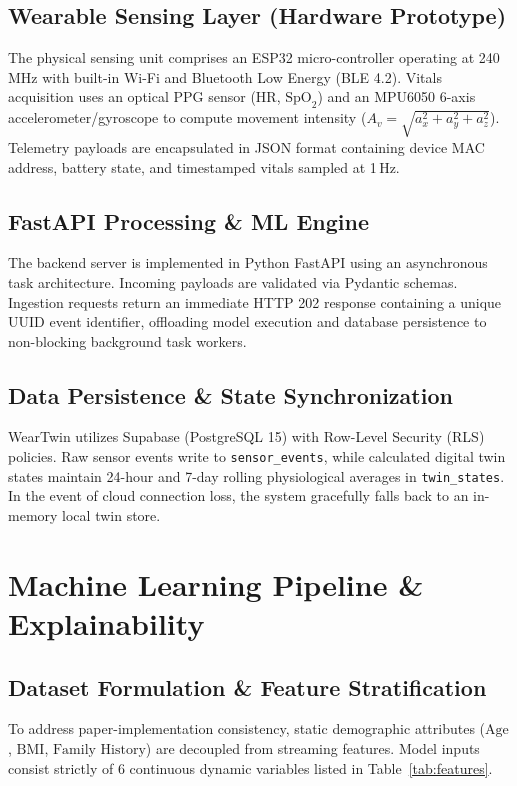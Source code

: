 \documentclass[conference]{IEEEtran}
\begin{document}
\subsection{Wearable Sensing Layer (Hardware Prototype)}
The physical sensing unit comprises an ESP32 micro-controller operating at 240\,MHz with built-in Wi-Fi and Bluetooth Low Energy (BLE 4.2). Vitals acquisition uses an optical PPG sensor ($\text{HR}$, $\text{SpO}_2$) and an MPU6050 6-axis accelerometer/gyroscope to compute movement intensity ($A_v = \sqrt{a_x^2 + a_y^2 + a_z^2}$). Telemetry payloads are encapsulated in JSON format containing device MAC address, battery state, and timestamped vitals sampled at 1\,Hz.

\subsection{FastAPI Processing \& ML Engine}
The backend server is implemented in Python FastAPI using an asynchronous task architecture. Incoming payloads are validated via Pydantic schemas. Ingestion requests return an immediate HTTP 202 response containing a unique UUID event identifier, offloading model execution and database persistence to non-blocking background task workers.

\subsection{Data Persistence \& State Synchronization}
WearTwin utilizes Supabase (PostgreSQL 15) with Row-Level Security (RLS) policies. Raw sensor events write to \texttt{sensor\_events}, while calculated digital twin states maintain 24-hour and 7-day rolling physiological averages in \texttt{twin_states}. In the event of cloud connection loss, the system gracefully falls back to an in-memory local twin store.

\section{Machine Learning Pipeline \& Explainability}

\subsection{Dataset Formulation \& Feature Stratification}
To address paper-implementation consistency, static demographic attributes ($\text{Age}$, $\text{BMI}$, $\text{Family History}$) are decoupled from streaming features. Model inputs consist strictly of 6 continuous dynamic variables listed in Table~\ref{tab:features}.
\end{document}
